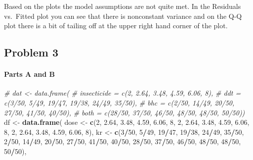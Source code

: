 \documentclass[
]{article}
\newenvironment{Shaded}{\begin{snugshade}}{\end{snugshade}}
\newcommand{\CommentTok}[1]{\textcolor[rgb]{0.56,0.35,0.01}{\textit{#1}}}
\newcommand{\DecValTok}[1]{\textcolor[rgb]{0.00,0.00,0.81}{#1}}
\newcommand{\FloatTok}[1]{\textcolor[rgb]{0.00,0.00,0.81}{#1}}
\newcommand{\KeywordTok}[1]{\textcolor[rgb]{0.13,0.29,0.53}{\textbf{#1}}}
\newcommand{\NormalTok}[1]{#1}
\newcommand{\OperatorTok}[1]{\textcolor[rgb]{0.81,0.36,0.00}{\textbf{#1}}}
\newcommand{\StringTok}[1]{\textcolor[rgb]{0.31,0.60,0.02}{#1}}
\begin{document}
Based on the plots the model assumptions are not quite met. In the
Residuals vs.~Fitted plot you can see that there is nonconstant variance
and on the Q-Q plot there is a bit of tailing off at the upper right
hand corner of the plot.

\hypertarget{problem-3}{%
\subsection{Problem 3}\label{problem-3}}

\hypertarget{parts-a-and-b}{%
\paragraph{Parts A and B}\label{parts-a-and-b}}

\begin{Shaded}
\begin{Highlighting}[]
\CommentTok{# dat <- data.frame(}
\CommentTok{#   insecticide = c(2, 2.64, 3.48, 4.59, 6.06, 8),}
\CommentTok{#   ddt = c(3/50, 5/49, 19/47, 19/38, 24/49, 35/50),}
\CommentTok{#   bhc = c(2/50, 14/49, 20/50, 27/50, 41/50, 40/50),}
\CommentTok{#   both = c(28/50, 37/50, 46/50, 48/50, 48/50, 50/50))}
\NormalTok{df <-}\StringTok{ }\KeywordTok{data.frame}\NormalTok{(}
\NormalTok{  dose <-}\StringTok{ }\KeywordTok{c}\NormalTok{(}\DecValTok{2}\NormalTok{, }\FloatTok{2.64}\NormalTok{, }\FloatTok{3.48}\NormalTok{, }\FloatTok{4.59}\NormalTok{, }\FloatTok{6.06}\NormalTok{, }\DecValTok{8}\NormalTok{, }\DecValTok{2}\NormalTok{, }\FloatTok{2.64}\NormalTok{, }\FloatTok{3.48}\NormalTok{, }\FloatTok{4.59}\NormalTok{, }\FloatTok{6.06}\NormalTok{, }\DecValTok{8}\NormalTok{, }\DecValTok{2}\NormalTok{, }\FloatTok{2.64}\NormalTok{, }\FloatTok{3.48}\NormalTok{, }\FloatTok{4.59}\NormalTok{, }\FloatTok{6.06}\NormalTok{, }\DecValTok{8}\NormalTok{),}
\NormalTok{  kr <-}\StringTok{ }\KeywordTok{c}\NormalTok{(}\DecValTok{3}\OperatorTok{/}\DecValTok{50}\NormalTok{, }\DecValTok{5}\OperatorTok{/}\DecValTok{49}\NormalTok{, }\DecValTok{19}\OperatorTok{/}\DecValTok{47}\NormalTok{, }\DecValTok{19}\OperatorTok{/}\DecValTok{38}\NormalTok{, }\DecValTok{24}\OperatorTok{/}\DecValTok{49}\NormalTok{, }\DecValTok{35}\OperatorTok{/}\DecValTok{50}\NormalTok{, }\DecValTok{2}\OperatorTok{/}\DecValTok{50}\NormalTok{, }\DecValTok{14}\OperatorTok{/}\DecValTok{49}\NormalTok{, }\DecValTok{20}\OperatorTok{/}\DecValTok{50}\NormalTok{, }\DecValTok{27}\OperatorTok{/}\DecValTok{50}\NormalTok{, }\DecValTok{41}\OperatorTok{/}\DecValTok{50}\NormalTok{, }\DecValTok{40}\OperatorTok{/}\DecValTok{50}\NormalTok{, }\DecValTok{28}\OperatorTok{/}\DecValTok{50}\NormalTok{, }\DecValTok{37}\OperatorTok{/}\DecValTok{50}\NormalTok{, }\DecValTok{46}\OperatorTok{/}\DecValTok{50}\NormalTok{, }\DecValTok{48}\OperatorTok{/}\DecValTok{50}\NormalTok{, }\DecValTok{48}\OperatorTok{/}\DecValTok{50}\NormalTok{, }\DecValTok{50}\OperatorTok{/}\DecValTok{50}\NormalTok{),}

\end{Highlighting}
\end{Shaded}
\end{document}
